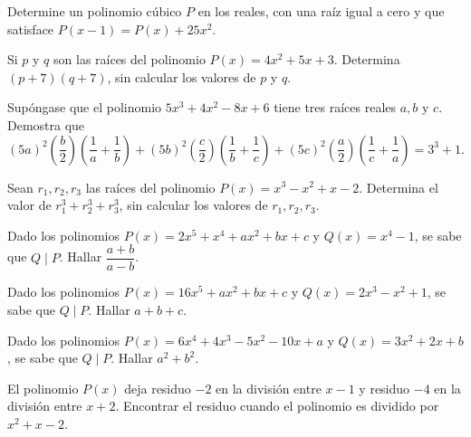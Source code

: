 \begin{section-problem}
    Determine un polinomio cúbico $P$ en los reales, con una raíz igual a cero y que satisface $P(x - 1) = P(x) + 25x^2$.
\end{section-problem}

\begin{section-problem}
    Si $p$ y $q$ son las raíces del polinomio $P(x) = 4x^2 + 5x + 3$.
    Determina $(p + 7)(q + 7)$, sin calcular los valores de $p$ y $q$.
\end{section-problem}

\begin{section-problem}
    Supóngase que el polinomio $5x^3 + 4x^2 - 8x + 6$ tiene tres raíces reales $a, b \mbox{ y } c$.
    Demostra que \[(5a)^2\left(\frac{b}{2}\right)\left(\frac{1}{a} + \frac{1}{b}\right) + (5b)^2\left(\frac{c}{2}\right)\left(\frac{1}{b} + \frac{1}{c}\right)+ (5c)^2\left(\frac{a}{2}\right)\left(\frac{1}{c} + \frac{1}{a}\right) = 3^3 + 1.\]
\end{section-problem}

\begin{section-problem}
    Sean $r_1, r_2, r_3$ las raíces del polinomio $P(x) = x^3 - x^2 + x - 2$.
    Determina el valor de $r^3_1 + r^3_2 + r^3_3$, sin calcular los valores de $r_1, r_2, r_3$.
\end{section-problem}


\begin{section-problem}
    Dado los polinomios $P(x) = 2x^5 + x^4 + ax^2 + bx + c$ y $Q(x) = x^4 - 1$, se sabe que $Q \mid P$.
    Hallar $\dfrac{a + b}{a - b}$.
\end{section-problem}

\begin{section-problem}
    Dado los polinomios $P(x) = 16x^5 + ax^2 + bx + c$ y $Q(x) = 2 x^3 - x^2 + 1$, se sabe que $Q \mid P$.
    Hallar $a + b + c$.
\end{section-problem}

\begin{section-problem}
    Dado los polinomios $P(x) = 6x^4 + 4x^3 - 5x^2 - 10x + a$ y $Q(x) = 3 x^2 + 2x + b$, se sabe que $Q \mid P$.
    Hallar $a^2 + b^2$.
\end{section-problem}


\begin{section-problem}
    El polinomio $P(x)$ deja residuo $-2$ en la división entre $x - 1$ y residuo $-4$ en la división entre $x + 2$.
    Encontrar el residuo cuando el polinomio es dividido por $x^2 + x - 2$.
\end{section-problem}

